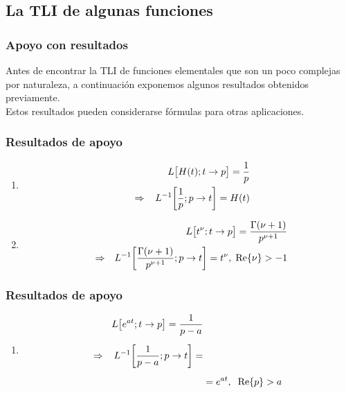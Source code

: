 \subsection{La TLI de algunas funciones}

\begin{frame}
\frametitle{Apoyo con resultados}
Antes de encontrar la TLI de funciones elementales que son un poco complejas por naturaleza, a continuación exponemos algunos resultados obtenidos previamente.
\\
\bigskip
\pause
Estos resultados pueden considerarse fórmulas para otras aplicaciones.
\end{frame}
\begin{frame}
\frametitle{Resultados de apoyo}
\begin{enumerate}[<+->]
\item
\begin{align*}
L \big[ H (t); t \to p \big] = \dfrac{1}{p} \\
\hspace{0.3cm} \Rightarrow \hspace{0.3cm} L^{-1} \bigg[ \dfrac{1}{p}; p \to t \bigg] = H (t)
\end{align*}
\item
\begin{align*}
L \big[ t^{\nu}; t \to p \big] = \dfrac{\Gamma(\nu + 1)}{p^{\nu + 1}} \\
\hspace{0.25cm} \Rightarrow \hspace{0.25cm} L^{-1} \bigg[ \dfrac{\Gamma(\nu + 1)}{p^{\nu + 1}}; p \to t \bigg] = t^{\nu}, \hspace{0.1cm} \Re{\nu} > - 1
\end{align*}
\seti
\end{enumerate}
\end{frame}
\begin{frame}
\frametitle{Resultados de apoyo}
\begin{enumerate}[<+->]
\conti
\item
\begin{align*}
 L \big[ e^{a t}; t \to p \big] = \dfrac{1}{p - a} \\[0.5em] 
\hspace{0.3cm} \Rightarrow \hspace{0.3cm} L^{-1} \bigg[ \dfrac{1}{p - a}; p \to t \bigg] = \\[0.5em]
&= e^{a t}, \hspace{0.2cm} \Re{p} > a
\end{align*}
\seti
\end{enumerate}
\end{frame}

